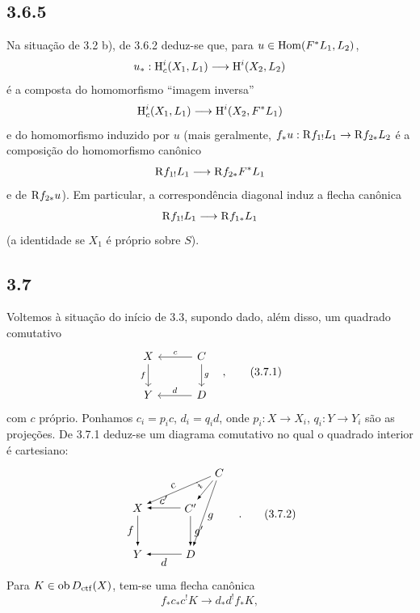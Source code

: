 \subsection*{3.6.5}
Na situação de 3.2 b), de 3.6.2 deduz-se que, para $u\in\operatorname{Hom}(F^*L_1,L_2)$,
\[
u_*:\mathrm{H}_c^i(X_1,L_1)\longrightarrow \mathrm{H}^i(X_2,L_2)
\]
é a composta do homomorfismo ``imagem inversa''
\[
\mathrm{H}_c^i(X_1,L_1)\longrightarrow \mathrm{H}^i(X_2,F^*L_1)
\]
e do homomorfismo induzido por $u$ (mais geralmente, $f_*u:\mathrm{R} f_{1!}L_1\to \mathrm{R} f_{2*}L_2$ é a composição do homomorfismo canônico
\[
\mathrm{R} f_{1!}L_1\longrightarrow \mathrm{R} f_{2*}F^*L_1
\]
e de $\mathrm{R} f_{2*}u$). Em particular, a correspondência diagonal induz a flecha canônica
\[
\mathrm{R} f_{1!}L_1\longrightarrow \mathrm{R} f_{1*}L_1
\]
(a identidade se $X_1$ é próprio sobre $S$).

\subsection*{3.7}
Voltemos à situação do início de 3.3, supondo dado, além disso, um quadrado comutativo
\begin{equation}
\begin{tikzcd}[column sep=3em,row sep=2em]
X \arrow[d,"f"'] & C \arrow[l,"c"'] \arrow[d,"g"] \\
Y & D \arrow[l,"d"']
\end{tikzcd}\quad ,
\tag{3.7.1}
\end{equation}
com $c$ próprio. Ponhamos $c_i=p_ic$, $d_i=q_id$, onde $p_i:X\to X_i$, $q_i:Y\to Y_i$ são as projeções. De 3.7.1 deduz-se um diagrama comutativo no qual o quadrado interior é cartesiano:
\begin{equation}
\begin{tikzpicture}[>=latex,baseline=(current bounding box.center),scale=1]
\node (X) at (0,0) {$X$};
\node (Y) at (0,-1.45) {$Y$};
\node (Cp) at (1.65,0) {$C'$};
\node (D) at (1.65,-1.45) {$D$};
\node (C) at (2.55,1.1) {$C$};
\draw[->] (C) -- node[above,sloped,pos=.55] {$c$} (X);
\draw[->] (C) -- node[above,sloped,pos=.50] {$i$} (Cp);
\draw[->] (C) -- node[right,pos=.55] {$g$} (D);
\draw[->] (Cp) -- node[above] {$c'$} (X);
\draw[->] (Cp) -- node[right] {$g'$} (D);
\draw[->] (X) -- node[left] {$f$} (Y);
\draw[->] (D) -- node[below] {$d$} (Y);
\end{tikzpicture}\quad .
\tag{3.7.2}
\end{equation}
Para $K\in\operatorname{ob}D_{\mathrm{ctf}}(X)$, tem-se uma flecha canônica
\begin{equation}
f_*c_*c^!K\longrightarrow d_*d^!f_*K,
\tag{3.7.3}
\end{equation}
